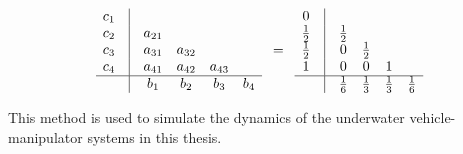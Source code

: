 \begin{align}
    \begin{matrix}
        c_1 & \vline & & & & \\
        c_2 & \vline & a_{21} & & & \\
        c_3 & \vline & a_{31} & a_{32} & & \\
        c_4 & \vline & a_{41} & a_{42} & a_{43} & \\
        \hline
        & \vline & b_1 & b_2 & b_3 & b_4
    \end{matrix}
    \quad=\quad 
    \begin{matrix}
        0 & \vline & & & & \\
        \frac{1}{2} & \vline & \frac{1}{2} & & & \\
        \frac{1}{2} & \vline & 0 & \frac{1}{2} & & \\
        1 & \vline & 0 & 0 & 1 & \\
        \hline
        & \vline & \frac{1}{6} & \frac{1}{3} & \frac{1}{3} & \frac{1}{6}
    \end{matrix}
\end{align}

This method is used to simulate the dynamics of the underwater vehicle-manipulator
systems in this thesis.
